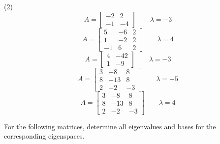 \begin{tasks}[resume, style=enumerate](2)
\task
  \begin{displaymath}
    A =
    \begin{bmatrix}
      -2 & 2 \\
      -1 & -4
    \end{bmatrix}
    \qquad
    \lambda = -3
  \end{displaymath}
\task
  \begin{displaymath}
    A =
    \begin{bmatrix}
      5 & -6 & 2 \\
      1 & -2 & 2 \\
      -1 & 6 & 2
    \end{bmatrix}
    \qquad
    \lambda = 4
  \end{displaymath}
\task
  \begin{displaymath}
    A =
    \begin{bmatrix}
      4 & -42 \\
      1 & -9
    \end{bmatrix}
    \qquad
    \lambda = -3
  \end{displaymath}
\task
  \begin{displaymath}
    A =
    \begin{bmatrix}
      3 & -8 & 8 \\
      8 & -13 & 8 \\
      2 & -2 & -3
    \end{bmatrix}
    \qquad
    \lambda = -5
  \end{displaymath}
\task
  \begin{displaymath}
    A =
    \begin{bmatrix}
      3 & -8 & 8 \\
      8 & -13 & 8 \\
      2 & -2 & -3
    \end{bmatrix}
    \qquad
    \lambda = 4
  \end{displaymath}
\end{tasks}
For the following matrices, determine all eigenvalues and bases for
the corresponding eigenspaces.
